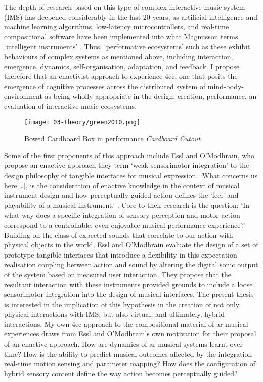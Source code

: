 The depth of research based on this type of complex interactive music system (IMS) has deepened considerably in the last 20 years, as artificial intelligence and machine learning algorithms, low-latency microcontrollers, and real-time compositional software have been implemented into what Magnusson terms `intelligent instruments' \citeyearpar[p. 8]{magnusson2009}. Thus, `performative ecosystems' \citep[]{waters2007} such as these exhibit behaviours of complex systems as mentioned above, including interaction, emergence, dynamics, self-organisation, adaptation, and feedback. I propose therefore that an enactivist approach to experience \gls{4ec}, one that posits the emergence of cognitive processes across the distributed system of mind-body-environment as being wholly appropriate in the design, creation, performance, an evaluation of interactive music ecosystems. 


\begin{wrapfigure}{l}{0.45\textwidth}
    \begin{minipage}{0.95\linewidth}
        \texttt{[image: 03-theory/green2010.png]}
        \captionsetup{justification=justified}
        \caption{Bowed Cardboard Box in performance \textit{Cardboard Cutout} \citep[from][]{green2010}}
    \end{minipage}
    \hfill
\end{wrapfigure}
Some of the first proponents of this approach include Essl and O'Modhrain, who propose an enactive approach they term `weak sensorimotor integration' to the design philosophy of tangible interfaces for musical expression. `What concerns us here[…], is the consideration of enactive knowledge in the context of musical instrument design and how perceptually guided action defines the `feel' and playability of a musical instrument.' \citeyearpar[p. 3]{essl2006}. Core to their research is the question: `In what way does a specific integration of sensory perception and motor action correspond to a controllable, even enjoyable musical performance experience?' Building on the class of expected sounds that correlate to our action with physical objects in the world, Essl and O'Modhrain evaluate the design of a set of prototype tangible interfaces that introduce a flexibility in this expectation-realisation coupling between action and sound by altering the digital sonic output of the system based on measured user interaction. They propose that the resultant interaction with these instruments provided grounds to include a loose sensorimotor integration into the design of musical interfaces. The present thesis is interested in the implication of this hypothesis in the creation of not only physical interactions with IMS, but also virtual, and ultimately, hybrid interactions. My own \gls{4ec} approach to the compositional material of \gls{ar} musical experiences draws from Essl and O'Modhrain's own motivation for their proposal of an enactive approach. How are dynamics of \gls{ar} musical systems learnt over time? How is the ability to predict musical outcomes affected by the integration real-time motion sensing and parameter mapping? How does the configuration of hybrid sensory content define the way action becomes perceptually guided?

